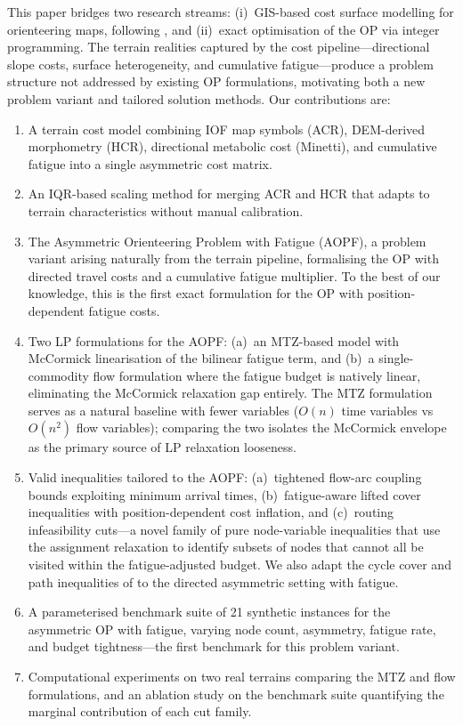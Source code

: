 \documentclass[preprint,11pt]{elsarticle}
\begin{document}
This paper bridges two research streams: (i)~GIS-based cost surface modelling for orienteering maps, following \citet{ica2021lcp}, and (ii)~exact optimisation of the OP via integer programming.
The terrain realities captured by the cost pipeline---directional slope costs, surface heterogeneity, and cumulative fatigue---produce a problem structure not addressed by existing OP formulations, motivating both a new problem variant and tailored solution methods.
Our contributions are:
\begin{enumerate}[nosep]
  \item A terrain cost model combining IOF map symbols (ACR), DEM-derived morphometry (HCR), directional metabolic cost (Minetti), and cumulative fatigue into a single asymmetric cost matrix.
  \item An IQR-based scaling method for merging ACR and HCR that adapts to terrain characteristics without manual calibration.
  \item The Asymmetric Orienteering Problem with Fatigue (AOPF), a problem variant arising naturally from the terrain pipeline, formalising the OP with directed travel costs and a cumulative fatigue multiplier.
  To the best of our knowledge, this is the first exact formulation for the OP with position-dependent fatigue costs.
  \item Two LP formulations for the AOPF: (a)~an MTZ-based model with McCormick linearisation of the bilinear fatigue term, and (b)~a single-commodity flow formulation where the fatigue budget is natively linear, eliminating the McCormick relaxation gap entirely.
  The MTZ formulation serves as a natural baseline with fewer variables ($O(n)$ time variables vs $O(n^2)$ flow variables); comparing the two isolates the McCormick envelope as the primary source of LP relaxation looseness.
  \item Valid inequalities tailored to the AOPF: (a)~tightened flow-arc coupling bounds exploiting minimum arrival times, (b)~fatigue-aware lifted cover inequalities with position-dependent cost inflation, and (c)~routing infeasibility cuts---a novel family of pure node-variable inequalities that use the assignment relaxation to identify subsets of nodes that cannot all be visited within the fatigue-adjusted budget.
  We also adapt the cycle cover and path inequalities of \citet{fischetti1998solving} to the directed asymmetric setting with fatigue.
  \item A parameterised benchmark suite of 21 synthetic instances for the asymmetric OP with fatigue, varying node count, asymmetry, fatigue rate, and budget tightness---the first benchmark for this problem variant.
  \item Computational experiments on two real terrains comparing the MTZ and flow formulations, and an ablation study on the benchmark suite quantifying the marginal contribution of each cut family.
\end{enumerate}
\end{document}
